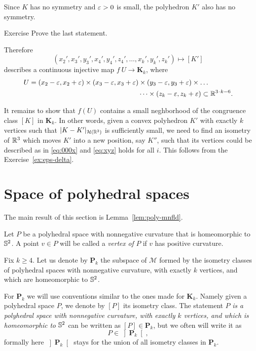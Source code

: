 Since $K$ has no symmetry and $\varepsilon>0$ is small,
the polyhedron $K'$ also has no symmetry.

\begin{thm}{Exercise}
Prove the last statement.
\end{thm}

Therefore 
$$(x_2',x_3',y_3',x_4',y_4',z_4',\dots,x_k',y_k',z_k')
\mapsto 
[K']$$ 
describes a continuous injective map 
$f\:U\to\mathbf{K}_k$,
where
\begin{align*}
 U=(x_2-\eps,x_2+\eps)\times (x_3-\eps,x_3+\eps)&\times (y_3-\eps,y_3+\eps)\times
\dots
\\
&\dots\times(z_k-\eps,z_k+\eps)\subset\RR^{3\cdot k-6}.
\end{align*}

It remains to show that $f(U)$ contains a small neghborhood of the congruence class $[K]$ in $\mathbf{K}_k$.
In other words, given a convex polyhedron $K'$ 
with exactly $k$ vertices such that $|K-K'|_{\mathcal{H}(\mathbb{R}^3)}$ is sufficiently small,
we need to find an isometry of $\mathbb{R}^3$ which moves $K'$ into a new position, say $K''$,
such that its vertices could be described as in \ref{eq:000x} and \ref{eq:xyz} holds 
for all $i$.
This follows from the Exercise~\ref{ex:eps-delta}.
\qeds



\section{Space of polyhedral spaces}\label{sec:poly-space}

The main result of this section is Lemma~\ref{lem:poly-mnfld}.

Let $P$ be a polyhedral space 
with nonnegative curvature that is
homeomorphic to $\mathbb{S}^2$.
A point $v\in P$ will be called a
\emph{vertex of $P$}
if $v$ has positive curvature.

Fix $k\ge 4$.
Let us denote by $\mathbf{P}_k$
the subspace of $\mathcal{M}$
formed by the isometry classes of polyhedral spaces
with nonnegative curvature,
with exactly $k$ vertices,
and which are
homeomorphic to $\mathbb{S}^2$.
 

For $\mathbf{P}_k$ we will use conventions similar to the ones made for $\mathbf{K}_k$.
Namely given a polyhedral space $P$, 
we denote by $[P]$ its isometry class.
The statement 
\emph{$P$ is a polyhedral space with nonnegative curvature, with exactly $k$ vertices, and which is homeomorphic to $\mathbb{S}^2$} 
can be written as $[P]\in \mathbf{P}_k$, 
but we often will write it as 
$$P\in\left]\mathbf{P}_k\right[,$$ 
formally here $\left]\mathbf{P}_k\right[$ 
stays for the union of all isometry classes in $\mathbf{P}_k$.

